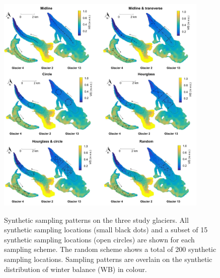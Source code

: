 \documentclass{article}
\begin{document}

\begin{figure}
	\centering
	\includegraphics[width =0.9\textwidth]{SamplingDesignAll.pdf}\\
	\caption{Synthetic sampling patterns on the three study glaciers. All synthetic sampling locations (small black dots) and a subset of 15 synthetic sampling locations (open circles) are shown for each sampling scheme. The random scheme shows a total of 200 synthetic sampling locations. Sampling patterns are overlain on the synthetic distribution of winter balance (WB) in colour. } 
       \label{fig:SyntheticSampleDesign}
\end{figure}
\end{document}
